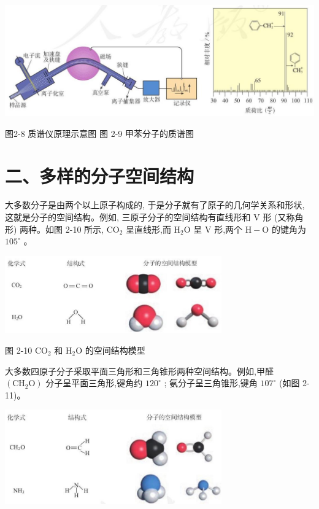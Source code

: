 \documentclass[10pt]{article}
\begin{document}
\begin{center}
\includegraphics[max width=1.0\textwidth]{images/0190e026-5a11-7df7-bd27-54d09026ba7a_45_586803.jpg}
\end{center}

图2-8 质谱仪原理示意图 图 2-9 甲苯分子的质谱图

\section*{二、多样的分子空间结构}

大多数分子是由两个以上原子构成的, 于是分子就有了原子的几何学关系和形状, 这就是分子的空间结构。例如, 三原子分子的空间结构有直线形和 V 形 (又称角形) 两种。如图 2-10 所示, \({\mathrm{{CO}}}_{2}\) 呈直线形,而 \({\mathrm{H}}_{2}\mathrm{O}\) 呈 \(\mathrm{V}\) 形,两个 \(\mathrm{H} - \mathrm{O}\) 的键角为 \({105}^{ \circ }\) 。

\begin{center}
\includegraphics[max width=0.7\textwidth]{images/0190e026-5a11-7df7-bd27-54d09026ba7a_46_902097.jpg}
\end{center}

图 2-10 \({\mathrm{{CO}}}_{2}\) 和 \({\mathrm{H}}_{2}\mathrm{O}\) 的空间结构模型

大多数四原子分子采取平面三角形和三角锥形两种空间结构。例如,甲醛 \(\left( {{\mathrm{{CH}}}_{2}\mathrm{O}}\right)\) 分子呈平面三角形,键角约 \({120}^{ \circ }\) ; 氨分子呈三角锥形,键角 \({107}^{ \circ }\) (如图 2-11)。

\begin{center}
\includegraphics[max width=0.7\textwidth]{images/0190e026-5a11-7df7-bd27-54d09026ba7a_46_618292.jpg}
\end{center}
\end{document}
